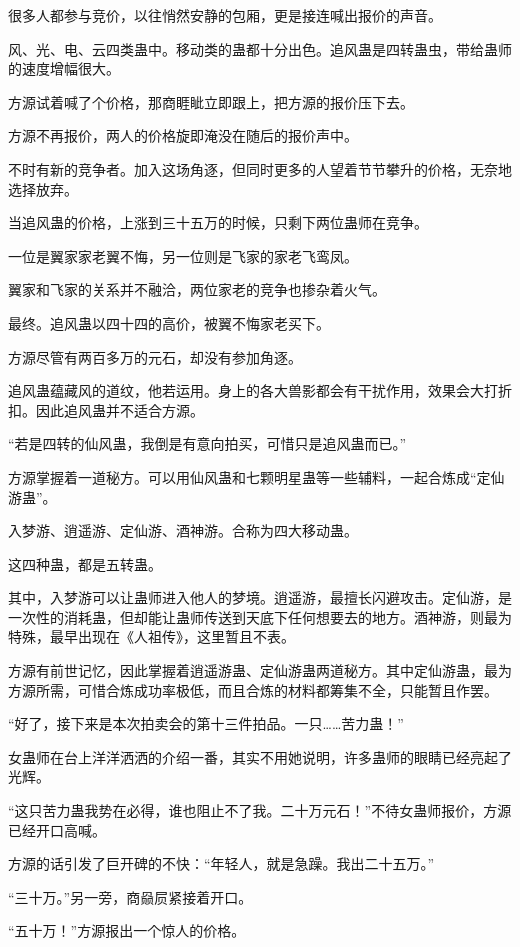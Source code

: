 \begin{this_body}
很多人都参与竞价，以往悄然安静的包厢，更是接连喊出报价的声音。

风、光、电、云四类蛊中。移动类的蛊都十分出色。追风蛊是四转蛊虫，带给蛊师的速度增幅很大。

方源试着喊了个价格，那商睚眦立即跟上，把方源的报价压下去。

方源不再报价，两人的价格旋即淹没在随后的报价声中。

不时有新的竞争者。加入这场角逐，但同时更多的人望着节节攀升的价格，无奈地选择放弃。

当追风蛊的价格，上涨到三十五万的时候，只剩下两位蛊师在竞争。

一位是翼家家老翼不悔，另一位则是飞家的家老飞鸾凤。

翼家和飞家的关系并不融洽，两位家老的竞争也掺杂着火气。

最终。追风蛊以四十四的高价，被翼不悔家老买下。

方源尽管有两百多万的元石，却没有参加角逐。

追风蛊蕴藏风的道纹，他若运用。身上的各大兽影都会有干扰作用，效果会大打折扣。因此追风蛊并不适合方源。

“若是四转的仙风蛊，我倒是有意向拍买，可惜只是追风蛊而已。”

方源掌握着一道秘方。可以用仙风蛊和七颗明星蛊等一些辅料，一起合炼成“定仙游蛊”。

入梦游、逍遥游、定仙游、酒神游。合称为四大移动蛊。

这四种蛊，都是五转蛊。

其中，入梦游可以让蛊师进入他人的梦境。逍遥游，最擅长闪避攻击。定仙游，是一次性的消耗蛊，但却能让蛊师传送到天底下任何想要去的地方。酒神游，则最为特殊，最早出现在《人祖传》，这里暂且不表。

方源有前世记忆，因此掌握着逍遥游蛊、定仙游蛊两道秘方。其中定仙游蛊，最为方源所需，可惜合炼成功率极低，而且合炼的材料都筹集不全，只能暂且作罢。

“好了，接下来是本次拍卖会的第十三件拍品。一只……苦力蛊！”

女蛊师在台上洋洋洒洒的介绍一番，其实不用她说明，许多蛊师的眼睛已经亮起了光辉。

“这只苦力蛊我势在必得，谁也阻止不了我。二十万元石！”不待女蛊师报价，方源已经开口高喊。

方源的话引发了巨开碑的不快：“年轻人，就是急躁。我出二十五万。”

“三十万。”另一旁，商赑屃紧接着开口。

“五十万！”方源报出一个惊人的价格。


\end{this_body}
